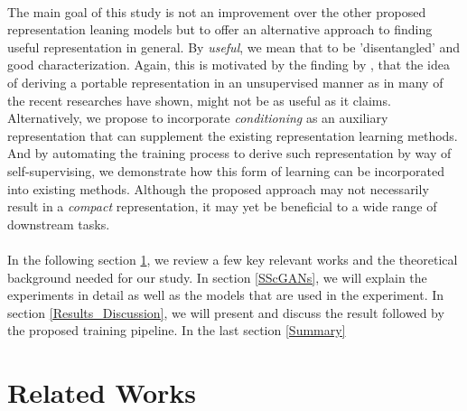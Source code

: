 \documentclass[11pt, letterpaper, oneside]{article}
\begin{document}
\paragraph{}
The main goal of this study is not an improvement over the other proposed representation leaning models but to offer an alternative approach to finding useful representation in general. By \textit{useful}, we mean that to be 'disentangled' and good characterization. Again, this is motivated by the finding by \cite{locatello_challenging_2019}, that the idea of deriving a portable representation in an unsupervised manner as in many of the recent researches have shown, might not be as useful as it claims. Alternatively, we propose to incorporate \textit{conditioning} as an auxiliary representation that can supplement the existing representation learning methods. And by automating the training process to derive such representation by way of self-supervising, we demonstrate how this form of learning can be incorporated into existing methods. Although the proposed approach may not necessarily result in a \textit{compact} representation, it may yet be beneficial to a wide range of downstream tasks.
\paragraph{}
In the following section \ref{RelatedWork}, we review a few key relevant works and the theoretical background needed for our study. In section \ref{SScGANs}, we will explain the experiments in detail as well as the models that are used in the experiment. In section \ref{Results_Discussion}, we will present and discuss the result followed by the proposed training pipeline. In the last section \ref{Summary}

\section{Related Works} \label{RelatedWork}
\end{document}
